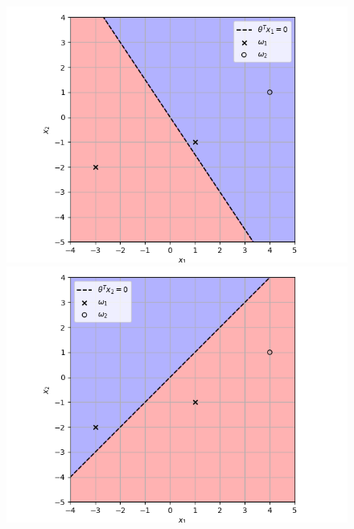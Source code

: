 \documentclass[a4paper, 10pt, twoside]{article}
\begin{document}
\begin{enumerate}[a)]
          \begin{figure}[h]
              \centering
              \begin{minipage}[t]{0.32\textwidth}
                  \centering
                  \includegraphics[width=\textwidth]{img/graph6.png}
              \end{minipage}\hfill
              \begin{minipage}[t]{0.32\textwidth}
                  \centering
                  \includegraphics[width=\textwidth]{img/graph8.png}
              \end{minipage}\hfill
              \begin{minipage}[t]{0.32\textwidth}
                  \centering

\end{minipage}
\end{figure}
\end{enumerate}
\end{document}
